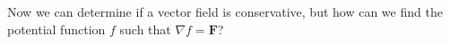 \documentclass[11pt,oneside,english]{amsart}
\theoremstyle{definition}
\newtheorem*{example}{Example}
\newcommand{\aspace}{\hspace{7mm}\text{and}\hspace{7mm}}
\newcommand{\pp}[2]{\frac{\partial{#1}}{\partial{#2}}}
\begin{document}
Now we can determine if a vector field is conservative, but how can we find the potential function $f$ such that $\nabla f=\mathbf{F}$?



%
%
%
%
%
%
%
%


%
%
%
%
%
\end{document}
